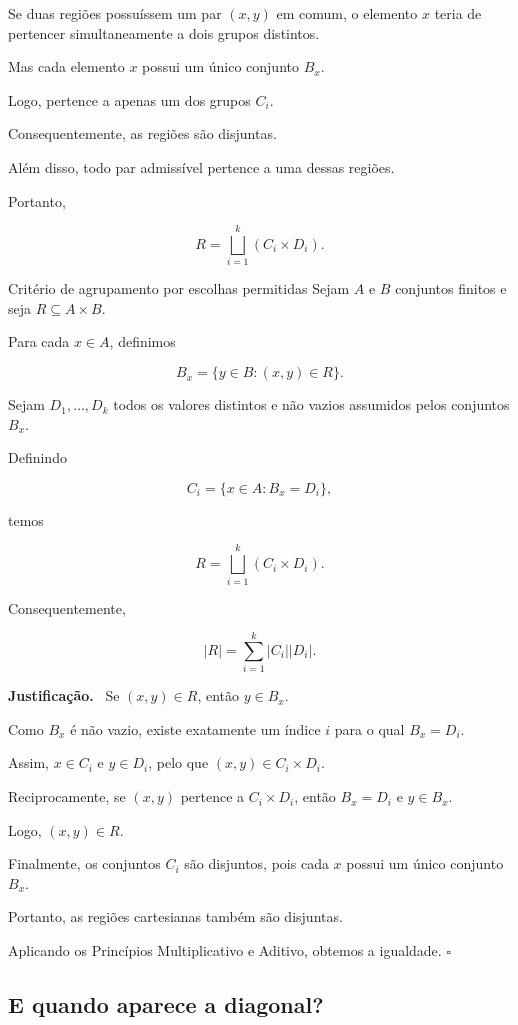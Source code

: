\documentclass[11pt,a4paper,oneside]{book}
\newcommand{\prova}{\textbf{Justificação.}\ }
\newcommand{\fimprova}{\hfill$\square$}
\newcommand{\card}[1]{\lvert #1\rvert}
\begin{document}
Se duas regiões possuíssem
um par $(x,y)$ em comum,
o elemento $x$ teria de
pertencer simultaneamente
a dois grupos distintos.

Mas cada elemento $x$
possui um único conjunto $B_x$.

Logo, pertence a apenas
um dos grupos $C_i$.

Consequentemente, as regiões
são disjuntas.

Além disso, todo par admissível
pertence a uma dessas regiões.

Portanto,

\[
R=\bigsqcup_{i=1}^{k}(C_i\times D_i).
\]

\begin{teoremabox}{Critério de agrupamento por escolhas permitidas}
Sejam $A$ e $B$ conjuntos finitos
e seja $R\subseteq A\times B$.

Para cada $x\in A$, definimos

\[
B_x=\{y\in B:(x,y)\in R\}.
\]

Sejam $D_1,\ldots,D_k$
todos os valores distintos
e não vazios assumidos pelos
conjuntos $B_x$.

Definindo

\[
C_i=\{x\in A:B_x=D_i\},
\]

temos

\[
\boxed{
R=\bigsqcup_{i=1}^{k}(C_i\times D_i)
}.
\]

Consequentemente,

\[
\boxed{
\card R=
\sum_{i=1}^{k}\card{C_i}\card{D_i}
}.
\]

\prova
Se $(x,y)\in R$, então $y\in B_x$.

Como $B_x$ é não vazio,
existe exatamente um índice $i$
para o qual $B_x=D_i$.

Assim, $x\in C_i$ e $y\in D_i$,
pelo que $(x,y)\in C_i\times D_i$.

Reciprocamente, se $(x,y)$
pertence a $C_i\times D_i$,
então $B_x=D_i$ e $y\in B_x$.

Logo, $(x,y)\in R$.

Finalmente, os conjuntos $C_i$
são disjuntos, pois cada $x$
possui um único conjunto $B_x$.

Portanto, as regiões cartesianas
também são disjuntas.

Aplicando os Princípios Multiplicativo
e Aditivo, obtemos a igualdade.
\fimprova
\end{teoremabox}

\subsection*{E quando aparece a diagonal?}
\end{document}
